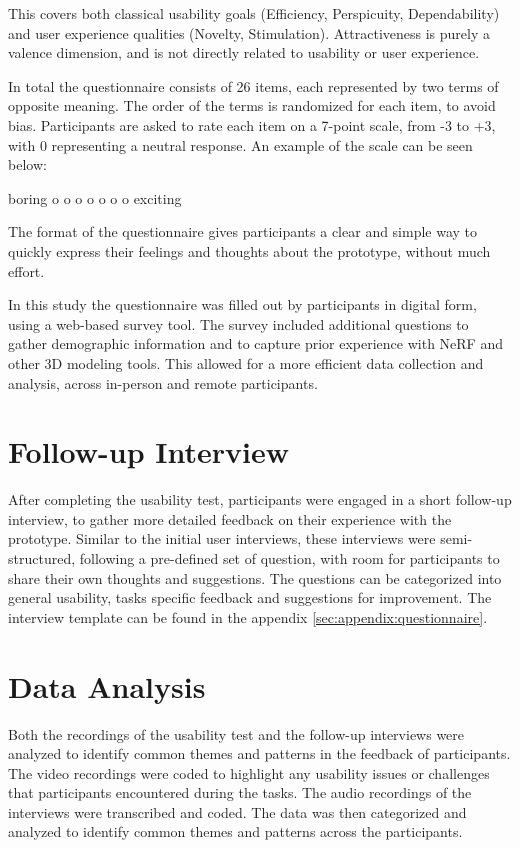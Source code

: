 This covers both classical usability goals (Efficiency, Perspicuity, Dependability) and user experience qualities (Novelty, Stimulation).
Attractiveness is purely a valence dimension, and is not directly related to usability or user experience.

In total the questionnaire consists of 26 items, each represented by two terms of opposite meaning. 
The order of the terms is randomized for each item, to avoid bias.
Participants are asked to rate each item on a 7-point scale, from -3 to +3, with 0 representing a neutral response.
An example of the scale can be seen below:

\begin{center}
  boring \quad o o o o o o o \quad exciting
\end{center}

The format of the questionnaire gives participants a clear and simple way to  quickly express their feelings and thoughts about the prototype, without much effort.

In this study the questionnaire was filled out by participants in digital form, using a web-based survey tool. %
The survey included additional questions to gather demographic information and to capture prior experience with NeRF and other 3D modeling tools.
This allowed for a more efficient data collection and analysis, across in-person and remote participants.

\section{Follow-up Interview}
\label{sec:study:interview}

After completing the usability test, participants were engaged in a short follow-up interview, to gather more detailed feedback on their experience with the prototype. 
Similar to the initial user interviews, these interviews were semi-structured, following a pre-defined set of question, with room for participants to share their own thoughts and suggestions.
The questions can be categorized into general usability, tasks specific feedback and suggestions for improvement.
The interview template can be found in the appendix \ref{sec:appendix:questionnaire}.


\section{Data Analysis}
\label{sec:study:analysis}

Both the recordings of the usability test and the follow-up interviews were analyzed to identify common themes and patterns in the feedback of participants.
The video recordings were coded to highlight any usability issues or challenges that participants encountered during the tasks.
The audio recordings of the interviews were transcribed and coded.
The data was then categorized and analyzed to identify common themes and patterns across the participants.

